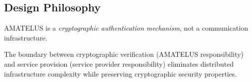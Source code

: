 \subsection{Design Philosophy}

\begin{proposition}
  \label{prop:design-philosophy}
  AMATELUS is a \emph{cryptographic authentication mechanism}, not a communication infrastructure.
  \leanok
\end{proposition}

\begin{theorem}
  \label{thm:boundary-clarity}
  The boundary between cryptographic verification (AMATELUS responsibility) and
  service provision (service provider responsibility) eliminates distributed
  infrastructure complexity while preserving cryptographic security properties.
  \leanok
\end{theorem}

